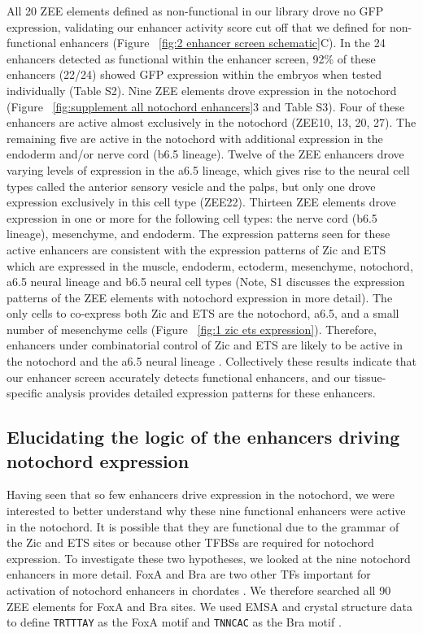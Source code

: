 All 20 ZEE elements defined as non-functional in our library drove no GFP expression, validating our enhancer activity score cut off that we defined for non-functional enhancers (Figure ~\ref{fig:2 enhancer screen schematic}C). In the 24 enhancers detected as functional within the enhancer screen, 92\% of these enhancers (22/24) showed GFP expression within the embryos when tested individually (Table S2). Nine ZEE elements drove expression in the notochord (Figure ~\ref{fig:supplement all notochord enhancers}3 and Table S3). Four of these enhancers are active almost exclusively in the notochord (ZEE10, 13, 20, 27). The remaining five are active in the notochord with additional expression in the endoderm and/or nerve cord (b6.5 lineage). Twelve of the ZEE enhancers drove varying levels of expression in the a6.5 lineage, which gives rise to the neural cell types called the anterior sensory vesicle and the palps, but only one drove expression exclusively in this cell type (ZEE22). Thirteen ZEE elements drove expression in one or more for the following cell types: the nerve cord (b6.5 lineage), mesenchyme, and endoderm. The expression patterns seen for these active enhancers are consistent with the expression patterns of Zic and ETS which are expressed in the muscle, endoderm, ectoderm, mesenchyme, notochord, a6.5 neural lineage and b6.5 neural cell types \cite{hudson2007,hudson2016,imai2006,picco2007,wagner2012} (Note, S1 discusses the expression patterns of the ZEE elements with notochord expression in more detail). The only cells to co-express both Zic and ETS are the notochord, a6.5, and a small number of mesenchyme cells (Figure ~\ref{fig:1 zic ets expression}). Therefore, enhancers under combinatorial control of Zic and ETS are likely to be active in the notochord and the a6.5 neural lineage \cite{ikeda2016,matsumoto2007a,wagner2012}. Collectively these results indicate that our enhancer screen accurately detects functional enhancers, and our tissue-specific analysis provides detailed expression patterns for these enhancers. 

\subsection{Elucidating the logic of the enhancers driving notochord expression}

Having seen that so few enhancers drive expression in the notochord, we were interested to better understand why these nine functional enhancers were active in the notochord. It is possible that they are functional due to the grammar of the Zic and ETS sites or because other TFBSs are required for notochord expression. To investigate these two hypotheses, we looked at the nine notochord enhancers in more detail. FoxA and Bra are two other TFs important for activation of notochord enhancers in chordates \cite{ang1994,casey1998,dal-pra2011,jose-edwards2015a,katikala2013,passamaneck2009a,wilkinson1990}. We therefore searched all 90 ZEE elements for FoxA and Bra sites. We used EMSA and crystal structure data to define \verb|TRTTTAY| as the FoxA motif \cite{katikala2013,li2017,passamaneck2009a} and \verb|TNNCAC| as the Bra motif \cite{casey1998,conlon2001,digregorio1999,dunn2009,muller1997}. 

